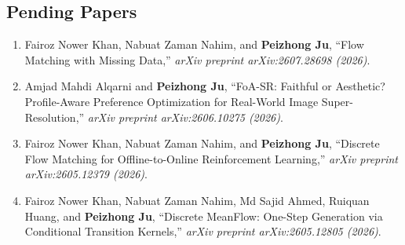 \documentclass[10pt,letter]{article}
\begin{document}
\begin{small}




\vspace{-0.4cm}
\subsection*{Pending Papers}
\begin{enumerate}


\item Fairoz Nower Khan, Nabuat Zaman Nahim, and \textbf{Peizhong Ju}, ``Flow Matching with Missing Data,'' \textit{arXiv preprint arXiv:2607.28698 (2026)}.

\item Amjad Mahdi Alqarni and \textbf{Peizhong Ju}, ``FoA-SR: Faithful or Aesthetic? Profile-Aware Preference Optimization for Real-World Image Super-Resolution,'' \textit{arXiv preprint arXiv:2606.10275 (2026)}.

\item Fairoz Nower Khan, Nabuat Zaman Nahim, and \textbf{Peizhong Ju}, ``Discrete Flow Matching for Offline-to-Online Reinforcement Learning,'' \textit{arXiv preprint arXiv:2605.12379 (2026)}.

\item Fairoz Nower Khan, Nabuat Zaman Nahim, Md Sajid Ahmed, Ruiquan Huang, and \textbf{Peizhong Ju}, ``Discrete MeanFlow: One-Step Generation via Conditional Transition Kernels,'' \textit{arXiv preprint arXiv:2605.12805 (2026)}.


\end{enumerate}
\end{small}
\end{document}
